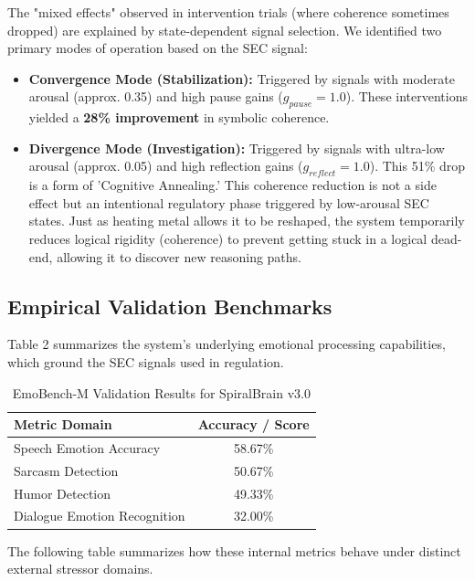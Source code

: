 \documentclass[11pt]{article}
\begin{document}
The "mixed effects" observed in intervention trials (where coherence sometimes dropped) are explained by state-dependent signal selection. We identified two primary modes of operation based on the SEC signal:

\begin{itemize}
    \item \textbf{Convergence Mode (Stabilization):} Triggered by signals with moderate arousal (approx. 0.35) and high pause gains ($g_{pause}=1.0$). These interventions yielded a \textbf{28\% improvement} in symbolic coherence.
    \item \textbf{Divergence Mode (Investigation):} Triggered by signals with ultra-low arousal (approx. 0.05) and high reflection gains ($g_{reflect}=1.0$). This 51\% drop is a form of 'Cognitive Annealing.' This coherence reduction is not a side effect but an intentional regulatory phase triggered by low-arousal SEC states. Just as heating metal allows it to be reshaped, the system temporarily reduces logical rigidity (coherence) to prevent getting stuck in a logical dead-end, allowing it to discover new reasoning paths.
\end{itemize}

\subsection{Empirical Validation Benchmarks}
Table 2 summarizes the system's underlying emotional processing capabilities, which ground the SEC signals used in regulation.

\begin{table}[htbp]
\centering
\caption{EmoBench-M Validation Results for SpiralBrain v3.0}
\begin{tabular}{lc}
\toprule
\textbf{Metric Domain} & \textbf{Accuracy / Score} \\
\midrule
Speech Emotion Accuracy & 58.67\% \\
Sarcasm Detection & 50.67\% \\
Humor Detection & 49.33\% \\
Dialogue Emotion Recognition & 32.00\% \\
\bottomrule
\end{tabular}
\end{table}

The following table summarizes how these internal metrics behave under distinct external stressor domains.
\end{document}
